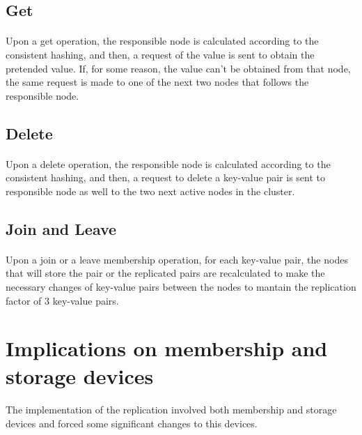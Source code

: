 \documentclass{report}
\begin{document}
				\subsection{Get}
					\paragraph{} Upon a get operation, the responsible node is calculated
					according to the consistent hashing, and then, a request of the value
					is sent to obtain the pretended value. If, for some reason, the 
					value can't be obtained from that node, the same request 
					is made to one of the next two nodes that follows the responsible 
					node.

				\subsection{Delete}
					\paragraph{} Upon a delete operation, the responsible node is calculated
					according to the consistent hashing, and then, a request to delete a
					key-value pair is sent to responsible node as well to the two next 
					active nodes in the cluster.

				\subsection{Join and Leave}
					\paragraph{} Upon a join or a leave membership operation, for each key-value 
					pair, the nodes that will store the pair or the replicated pairs are
					recalculated to make the necessary changes of key-value pairs between
					the nodes to mantain the replication factor of 3 key-value pairs.

			\section{Implications on membership and storage devices}
	
				\paragraph{} The implementation of the replication involved both membership
				and storage devices and forced some significant changes to this devices.
				
\end{document}

